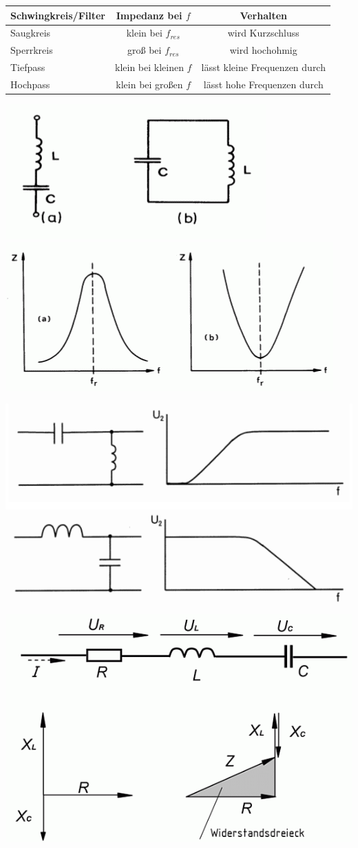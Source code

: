 \documentclass[12pt,a4paper, twoside]{article}
\renewcommand{\=}[1]{\stackrel{#1}{=}}
\theoremstyle{definition}
\theoremstyle{remark}
\begin{document}
\begin{center}
\begin{framed}
\begin{tabular}{lcc}
Schwingkreis/Filter & Impedanz bei $f$ & Verhalten\\
\midrule
Saugkreis & klein bei $f_{res}$ & wird Kurzschluss\\
Sperrkreis & groß bei $f_{res}$ & wird hochohmig\\
Tiefpass & klein bei kleinen $f$ & lässt kleine Frequenzen durch\\
Hochpass & klein bei großen $f$ & lässt hohe Frequenzen durch
\end{tabular}


\includegraphics[width=0.45\linewidth]{pic/schwingkreis.png}
\includegraphics[width=0.45\linewidth]{pic/schwingkreis-antwort.png}
\end{framed}
\end{center}


\includegraphics[width=0.45\linewidth]{pic/hochtiefpass.png}
\includegraphics[width=0.45\linewidth]{pic/rlc.png}\\
\end{document}
